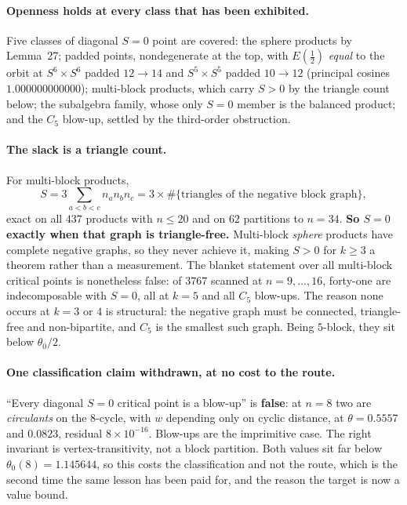 \paragraph{Openness holds at every class that has been exhibited.} Five classes of diagonal $S=0$ point are covered: the sphere products by Lemma~27; padded points, nondegenerate at the top, with $E(\tfrac12)$ \emph{equal} to the orbit at $S^6\times S^6$ padded $12\to14$ and $S^5\times S^5$ padded $10\to12$ (principal cosines $1.000000000000$); multi-block products, which carry $S>0$ by the triangle count below; the subalgebra family, whose only $S=0$ member is the balanced product; and the $C_5$ blow-up, settled by the third-order obstruction.

\paragraph{The slack is a triangle count.} For multi-block products,
\[
S=3\sum_{a<b<c}n_an_bn_c=3\times\#\{\text{triangles of the negative block graph}\},
\]
exact on all $437$ products with $n\le20$ and on $62$ partitions to $n=34$. \textbf{So $S=0$ exactly when that graph is triangle-free.} Multi-block \emph{sphere} products have complete negative graphs, so they never achieve it, making $S>0$ for $k\ge3$ a theorem rather than a measurement. The blanket statement over all multi-block critical points is nonetheless false: of $3767$ scanned at $n=9,\dots,16$, forty-one are indecomposable with $S=0$, all at $k=5$ and all $C_5$ blow-ups. The reason none occurs at $k=3$ or $4$ is structural: the negative graph must be connected, triangle-free and non-bipartite, and $C_5$ is the smallest such graph. Being $5$-block, they sit below $\theta_0/2$.

\paragraph{One classification claim withdrawn, at no cost to the route.} ``Every diagonal $S=0$ critical point is a blow-up'' is \textbf{false}: at $n=8$ two are \emph{circulants} on the $8$-cycle, with $w$ depending only on cyclic distance, at $\theta=0.5557$ and $0.0823$, residual $8\times10^{-16}$. Blow-ups are the imprimitive case. The right invariant is vertex-transitivity, not a block partition. Both values sit far below $\theta_0(8)=1.145644$, so this costs the classification and not the route, which is the second time the same lesson has been paid for, and the reason the target is now a value bound.

